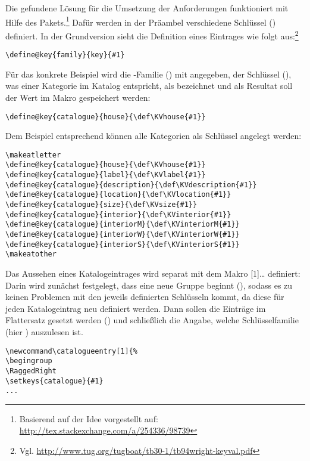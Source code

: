 \documentclass[ngerman]{dtk}
\makeatletter
\newcommand\catalogueentry[1]{%
\RaggedRight\begingroup
\setkeys{catalogue}{#1}%
\ifdef{\KVhouse}{\section{\KVhouse
			\ifdef{\KVlabel}{\label{\KVlabel}}{}}
			}{}%
\begin{labeling}{Beschreibung}
\ifdef{\KVdescription}{\item[Beschreibung] \KVdescription}{}%
\ifdef{\KVlocation}{\item[Verortung] \KVlocation}{}%
\ifdef{\KVinterior}{%
	\item[Ausstattung] \KVinterior %
	\ifboolexpr{bool{@KVinteriorM} or bool {@KVinteriorW} or bool {@KVinteriorS}}{%
	\begin{labeling}{Wandgemälde}
			\ifdef{\KVinteriorM}{\item[Mosaike:] \KVinteriorM}{}
			\ifdef{\KVinteriorW}{\item[Wandgemälde:] \KVinteriorW}{}
			\ifdef{\KVinteriorS}{\item[Statuen:] \KVinteriorS}{}
			\end{labeling}
		}{}}%
	{%
	\ifboolexpr{bool{@KVinteriorM} or bool {@KVinteriorW} or bool {@KVinteriorS}}{%
		\item[Ausstattung]%
	\begin{labeling}{Wandgemälde}	
				\ifdef{\KVinteriorM}{\item[Mosaike:] \KVinteriorM}{}
				\ifdef{\KVinteriorW}{\item[Wandgemälde:] \KVinteriorW}{}
				\ifdef{\KVinteriorS}{\item[Statuen:] \KVinteriorS}{}
			\end{labeling}
	}{}}%
\ifdef{\KVsize}{	\item[Größe] \SI{\KVsize}{\meter\squared}}{}%
\ifdef{\KVliterature}{\item[Erwähnungen]S.\ \KVliterature}{}%
\end{labeling}
\endgroup
}
\makeatother
\begin{document}
Die gefundene Lösung für die Umsetzung der Anforderungen funktioniert mit Hilfe des    Pakets.\footnote{Basierend auf der Idee vorgestellt auf: \url{http://tex.stackexchange.com/a/254336/98739}}
Dafür werden in der Präambel verschiedene Schlüssel () definiert.
In der Grundversion sieht die Definition eines Eintrages wie folgt aus:\footnote{Vgl. \url{http://www.tug.org/tugboat/tb30-1/tb94wright-keyval.pdf}}
\begin{lstlisting}[style=noNumber]
\define@key{family}{key}{#1}
\end{lstlisting}
Für das konkrete Beispiel wird die -Familie () mit  angegeben,
der Schlüssel (), was einer Kategorie im Katalog entspricht, 
als  bezeichnet und als Resultat soll der Wert im Makro  gespeichert werden:
\begin{lstlisting}[style=noNumber]
\define@key{catalogue}{house}{\def\KVhouse{#1}}
\end{lstlisting}
Dem Beispiel entsprechend können alle Kategorien als Schlüssel angelegt werden:
\begin{lstlisting}[style=number]
\makeatletter
\define@key{catalogue}{house}{\def\KVhouse{#1}}
\define@key{catalogue}{label}{\def\KVlabel{#1}}
\define@key{catalogue}{description}{\def\KVdescription{#1}}
\define@key{catalogue}{location}{\def\KVlocation{#1}}
\define@key{catalogue}{size}{\def\KVsize{#1}}
\define@key{catalogue}{interior}{\def\KVinterior{#1}}
\define@key{catalogue}{interiorM}{\def\KVinteriorM{#1}}
\define@key{catalogue}{interiorW}{\def\KVinteriorW{#1}}
\define@key{catalogue}{interiorS}{\def\KVinteriorS{#1}}
\makeatother
\end{lstlisting}
Das Aussehen eines Katalogeintrages wird separat mit dem Makro
 [1]{\ldots} 
definiert:
Darin wird zunächst festgelegt,
dass eine neue Gruppe beginnt (), sodass
es zu keinen Problemen mit den jeweils definierten Schlüsseln kommt, 
da diese für jeden Katalogeintrag neu definiert werden.
Dann sollen die  Einträge im Flattersatz gesetzt werden () und schließlich die Angabe,
 welche Schlüsselfamilie (hier ) auszulesen ist.
\begin{lstlisting}[style=number]
\newcommand\catalogueentry[1]{%
\begingroup
\RaggedRight
\setkeys{catalogue}{#1}
...
\end{lstlisting}
\end{document}
